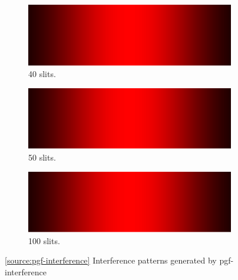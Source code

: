 \documentclass[oneside]{book}
\begin{document}
\begin{figure}[htbp]
    \centering
    \ContinuedFloat %
    \begin{subfigure}[c]{\textwidth}
        \centering
        \includegraphics[width=\textwidth,page=9]{../images/pgf-interference/interference.pdf}
        \caption{40 slits.}
    \end{subfigure}%

    \begin{subfigure}[c]{\textwidth}
        \centering
        \includegraphics[width=\textwidth,page=10]{../images/pgf-interference/interference.pdf}
        \caption{50 slits.}
    \end{subfigure}%

    \begin{subfigure}[c]{\textwidth}
        \centering
        \includegraphics[width=\textwidth,page=11]{../images/pgf-interference/interference.pdf}
        \caption{100 slits.}
    \end{subfigure}%
    \caption{\ref{source:pgf-interference} Interference patterns generated by pgf-interference}
    \label{fig:pgf-interference}
\end{figure}
\end{document}
